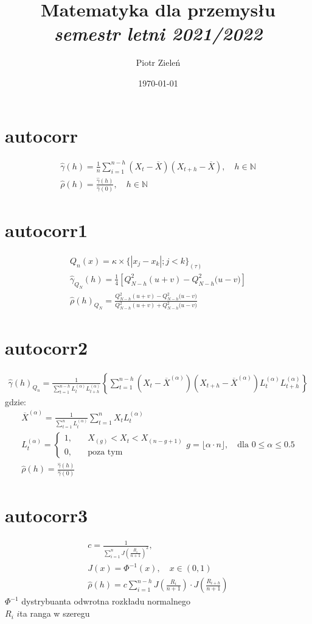 \documentclass[12pt]{mwart}
\author{Piotr Zieleń}
\title{Matematyka dla przemysłu\\\emph{semestr letni 2021/2022}}
\date{\today}
\begin{document}
	\section{autocorr}
	\begin{gather}
		\hat{\gamma}(h)=\frac{1}{n}\displaystyle{\sum_{i=1}^{n-h}{\left(X_t-\overline{X}\right)\left(X_{t+h}-\overline{X}\right)}}, \quad h\in\mathbb{N}\\
		\hat{\rho}(h)=\frac{\hat{\gamma}(h)}{\hat{\gamma}(0)}, \quad h\in\mathbb{N}
	\end{gather}
	\section{autocorr1}
	\begin{gather}
		Q_n(x)=\kappa\times\{|x_j-x_k|; j<k\}_{(\tau)}\\
		\hat{\gamma}_{Q_N}(h)=\frac{1}{4}\left[Q_{N-h}^2(u + v) - Q_{N-h}^2{(u-v})\right]\\
		\hat{\rho}(h)_{Q_N}=\frac{Q_{N-h}^2(u + v) - Q_{N-h}^2{(u-v})}{Q_{N-h}^2(u + v) + Q_{N-h}^2{(u-v})}
	\end{gather}
	\section{autocorr2}
	\begin{gather}
		\hat{\gamma}(h)_{Q_n}=\frac{1}{\sum_{t=1}^{n-h}{L_t^{(\alpha)}L_{t+h}^{(\alpha)}}}\left\{\displaystyle{\sum_{t=1}^{n-h}}\left(X_t-\overline{X}^{(\alpha)}\right)\left(X_{t+h}-\overline{X}^{(\alpha)}\right)L_t^{(\alpha)}L_{t+h}^{(\alpha)}\right\}
	\end{gather}
gdzie:
\begin{gather}
	\overline{X}^{(\alpha)}=\frac{1}{\sum_{t=1}^nL_t^{(\alpha)}}\displaystyle{\sum_{t=1}^n{X_tL_t^{(\alpha)}}}\\
	L_t^{(\alpha)}=\begin{cases}
		1,\quad & X_{(g)} < X_t < X_{(n-g+1)} \\
		0, \quad & \text{poza tym}
	\end{cases}
	g=\lfloor{\alpha\cdot n\rfloor},\quad\text{dla } 0\leq\alpha\leq0.5\\
	\hat{\rho}(h)=\frac{\hat{\gamma}(h)}{\hat{\gamma}(0)}
\end{gather}
\section{autocorr3}
\begin{gather}
	c=\frac{1}{\sum_{i=1}^nJ\left(\frac{R_i}{n+1}\right)^2},\\
	J(x) = \Phi^{-1}(x),\quad x\in(0, 1)\\
	\hat{\rho}(h)=c\displaystyle{\sum_{i=1}^{n-h}J\left(\frac{R_i}{n+1}\right)\cdot J\left(\frac{R_{i+h}}{n+1}\right)}
\end{gather}
$\Phi^{-1}$ \pauza dystrybuanta odwrotna rozkładu normalnego\\
$R_i$ \pauza $i${\dywiz}ta ranga w szeregu
\end{document}
